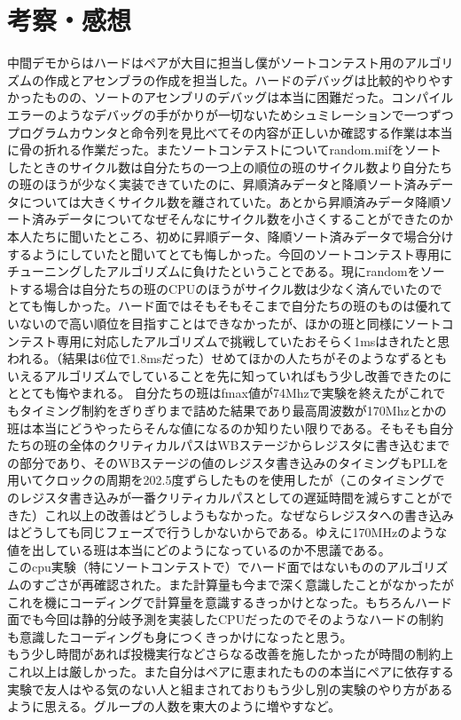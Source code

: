 \documentclass[a4paper,11pt,oneside,openany]{jsarticle}
\begin{document}
\section{考察・感想}
中間デモからはハードはペアが大目に担当し僕がソートコンテスト用のアルゴリズムの作成とアセンブラの作成を担当した。ハードのデバッグは比較的やりやすかったものの、ソートのアセンブリのデバッグは本当に困難だった。コンパイルエラーのようなデバッグの手がかりが一切ないためシュミレーションで一つずつプログラムカウンタと命令列を見比べてその内容が正しいか確認する作業は本当に骨の折れる作業だった。またソートコンテストについてrandom.mifをソートしたときのサイクル数は自分たちの一つ上の順位の班のサイクル数より自分たちの班のほうが少なく実装できていたのに、昇順済みデータと降順ソート済みデータについては大きくサイクル数を離されていた。あとから昇順済みデータ降順ソート済みデータについてなぜそんなにサイクル数を小さくすることができたのか本人たちに聞いたところ、初めに昇順データ、降順ソート済みデータで場合分けするようにしていたと聞いてとても悔しかった。今回のソートコンテスト専用にチューニングしたアルゴリズムに負けたということである。現にrandomをソートする場合は自分たちの班のCPUのほうがサイクル数は少なく済んでいたのでとても悔しかった。ハード面ではそもそもそこまで自分たちの班のものは優れていないので高い順位を目指すことはできなかったが、ほかの班と同様にソートコンテスト専用に対応したアルゴリズムで挑戦していたおそらく1msはきれたと思われる。（結果は6位で1.8msだった）せめてほかの人たちがそのようなずるともいえるアルゴリズムでしていることを先に知っていればもう少し改善できたのにととても悔やまれる。
自分たちの班はfmax値が74Mhzで実験を終えたがこれでもタイミング制約をぎりぎりまで詰めた結果であり最高周波数が170Mhzとかの班は本当にどうやったらそんな値になるのか知りたい限りである。そもそも自分たちの班の全体のクリティカルパスはWBステージからレジスタに書き込むまでの部分であり、そのWBステージの値のレジスタ書き込みのタイミングもPLLを用いてクロックの周期を202.5度ずらしたものを使用したが（このタイミングでのレジスタ書き込みが一番クリティカルパスとしての遅延時間を減らすことができた）これ以上の改善はどうしようもなかった。なぜならレジスタへの書き込みはどうしても同じフェーズで行うしかないからである。ゆえに170MHzのような値を出している班は本当にどのようになっているのか不思議である。\\
このcpu実験（特にソートコンテストで）でハード面ではないもののアルゴリズムのすごさが再確認された。また計算量も今まで深く意識したことがなかったがこれを機にコーディングで計算量を意識するきっかけとなった。もちろんハード面でも今回は静的分岐予測を実装したCPUだったのでそのようなハードの制約も意識したコーディングも身につくきっかけになったと思う。\\
もう少し時間があれば投機実行などさらなる改善を施したかったが時間の制約上これ以上は厳しかった。また自分はペアに恵まれたものの本当にペアに依存する実験で友人はやる気のない人と組まされておりもう少し別の実験のやり方があるように思える。グループの人数を東大のように増やすなど。
\end{document}
